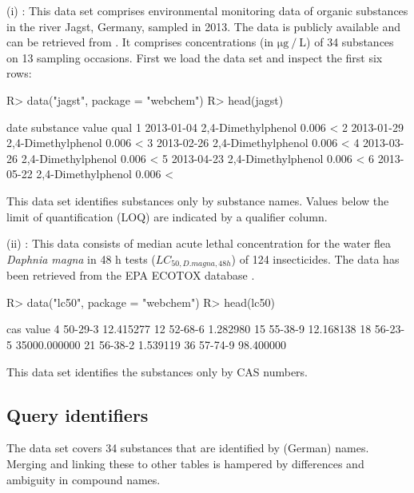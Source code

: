 \documentclass[article]{jss}
\begin{document}
(i) : This data set comprises environmental monitoring data of organic substances in the river Jagst, Germany, sampled in 2013.
The data is publicly available and can be retrieved from .
It comprises concentrations  (in $\mathrm{\mu g~/~L}$) of  34 substances  on 13 sampling occasions.
First we load the data set and inspect the first six rows:
%
\begin{CodeChunk}
\begin{CodeInput}
R> data("jagst", package = "webchem")
R> head(jagst)
\end{CodeInput}
\begin{CodeOutput}
        date          substance value qual
1 2013-01-04 2,4-Dimethylphenol 0.006    <
2 2013-01-29 2,4-Dimethylphenol 0.006    <
3 2013-02-26 2,4-Dimethylphenol 0.006    <
4 2013-03-26 2,4-Dimethylphenol 0.006    <
5 2013-04-23 2,4-Dimethylphenol 0.006    <
6 2013-05-22 2,4-Dimethylphenol 0.006    <
\end{CodeOutput}
\end{CodeChunk}
%
This data set identifies substances only by substance names. Values below the limit of quantification (LOQ) are indicated by a qualifier column.

(ii) : This data consists of median acute lethal concentration for the water flea \textit{Daphnia magna} in 48 h tests ($LC_{50, D.magna, 48h}$) of 124 insecticides.
The data has been retrieved from the EPA ECOTOX database \citep{epa_2016}.
%
\begin{CodeChunk}
\begin{CodeInput}
R> data("lc50", package = "webchem")
R> head(lc50)
\end{CodeInput}
\begin{CodeOutput}
       cas        value
4  50-29-3    12.415277
12 52-68-6     1.282980
15 55-38-9    12.168138
18 56-23-5 35000.000000
21 56-38-2     1.539119
36 57-74-9    98.400000
\end{CodeOutput}
\end{CodeChunk}
%
This data set identifies the substances only by CAS numbers.


\subsection[Query identifiers]{Query identifiers}
The  data set covers 34 substances that are identified by (German) names.
Merging and linking these to other tables is hampered by differences and ambiguity in compound names.
\end{document}
